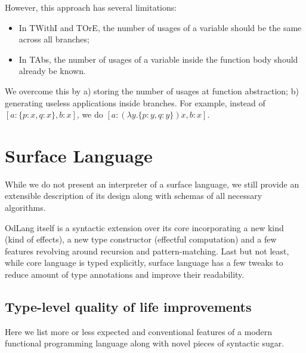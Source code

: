 \documentclass[a4paper,14pt]{extreport}
\begin{document}
However, this approach has several limitations:

\begin{itemize}
    \item In TWithI and TOrE, the number of usages of a variable should be the
        same across all branches;
    \item In TAbs, the number of usages of a variable inside the function body
        should already be known.
\end{itemize}

We overcome this by a) storing the number of usages at function abstraction;
b) generating useless applications inside branches. For example, instead of
$[a: \{p: x, q: x\}, b: x]$, we do $[a: (\lambda y. \{p: y, q: y\}) x, b: x]$.

\chapter{Surface Language}

While we do not present an interpreter of a surface language, we still provide
an extensible description of its design along with schemas of all necessary
algorithms.

OdLang itself is a syntactic extension over its core incorporating a new kind
(kind of effects), a new type constructor (effectful computation) and a few
features revolving around recursion and pattern-matching. Last but not
least, while core language is typed explicitly, surface language has a few
tweaks to reduce amount of type annotations and improve their readability.

\section{Type-level quality of life improvements}

Here we list more or less expected and conventional features of a modern
functional programming language along with novel pieces of syntactic sugar.
\end{document}
